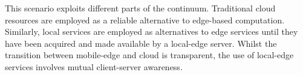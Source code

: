 This scenario exploits different parts of the continuum. Traditional cloud resources are employed as a reliable alternative to edge-based computation. Similarly, local services are employed as alternatives to edge services until they have been acquired and made available by a local-edge server. Whilst the transition between mobile-edge and cloud is transparent, the use of local-edge services involves mutual client-server awareness.

